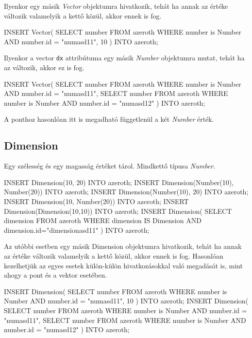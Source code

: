 Ilyenkor egy másik \textit{Vector} objektumra hivatkozik, tehát ha annak az értéke változik valamelyik a kettő közül, akkor ennek is fog.

\begin{sql}
INSERT Vector(
    SELECT number FROM azeroth
    WHERE number is Number AND number.id = "numasd11", 10
) INTO azeroth;
\end{sql}

Ilyenkor a vector \texttt{dx} attribútuma egy másik \textit{Number} objektumra mutat, tehát ha az változik, akkor ez is fog.

\begin{sql}
INSERT Vector(
    SELECT number FROM azeroth
    WHERE number is Number AND number.id = "numasd11",
    SELECT number FROM azeroth
    WHERE number is Number AND number.id = "numasd12"
) INTO azeroth;
\end{sql}

A ponthoz hasonlóan itt is megadható függetlenül a két \textit{Number} érték.

\subsection{Dimension}

Egy szélesség és egy magasság értéket tárol. Mindkettő típusa \textit{Number}.

\begin{sql}
INSERT Dimension(10, 20) INTO azeroth;
INSERT Dimension(Number(10), Number(20)) INTO azeroth;
INSERT Dimension(Number(10), 20) INTO azeroth;
INSERT Dimension(10, Number(20)) INTO azeroth;
INSERT Dimension(Dimension(10,10)) INTO azeroth;
INSERT Dimension(
    SELECT dimension FROM azeroth
    WHERE dimension IS Dimension AND dimension.id="dimensionasd11"
) INTO azeroth;
\end{sql}

Az utóbbi esetben egy másik Dimension objektumra hivatkozik, tehát ha annak az értéke változik valamelyik a kettő közül, akkor ennek is fog. Hasonlóan kezelhetjük az egyes esetek külön-külön hivatkozásokkal való megadását is, mint ahogy a pont és a vektor esetében.

\begin{sql}
INSERT Dimension(
    SELECT number FROM azeroth
    WHERE number is Number AND number.id = "numasd11", 10
) INTO azeroth;
INSERT Dimension(
    SELECT number FROM azeroth
    WHERE number is Number AND number.id = "numasd11",
    SELECT number FROM azeroth
    WHERE number is Number AND number.id = "numasd12"
) INTO azeroth;
\end{sql}

